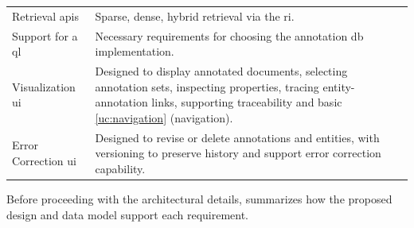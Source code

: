 \begin{table}[htbp]
\begin{tabularx}{\textwidth}{p{4.5cm}X}
Retrieval \acp{api} &
Sparse, dense, hybrid retrieval via the \ac{ri}. \\

Support for a \ac{ql} &
Necessary requirements for choosing the annotation \ac{db} implementation. \\

Visualization \ac{ui} &
Designed to display annotated documents, selecting annotation sets, inspecting properties, tracing entity-annotation links, supporting traceability and basic \ref{uc:navigation} (navigation). \\
 
Error Correction \ac{ui} &
Designed to revise or delete annotations and entities, with versioning to preserve history and support error correction capability. \\

\bottomrule
\end{tabularx}
\end{table}

Before proceeding with the architectural details,  summarizes how the proposed design and data model support each requirement.









